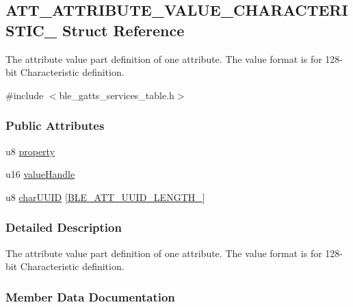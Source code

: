 \hypertarget{struct_a_t_t___a_t_t_r_i_b_u_t_e___v_a_l_u_e___c_h_a_r_a_c_t_e_r_i_s_t_i_c__16}{}\subsection{A\+T\+T\+\_\+\+A\+T\+T\+R\+I\+B\+U\+T\+E\+\_\+\+V\+A\+L\+U\+E\+\_\+\+C\+H\+A\+R\+A\+C\+T\+E\+R\+I\+S\+T\+I\+C\+\_ Struct Reference}
\label{struct_a_t_t___a_t_t_r_i_b_u_t_e___v_a_l_u_e___c_h_a_r_a_c_t_e_r_i_s_t_i_c__16}


The attribute value part definition of one attribute. The value format is for 128-\/bit Characteristic definition.  




{\ttfamily \#include $<$ble\+\_\+gatts\+\_\+services\+\_\+table.\+h$>$}

\subsubsection*{Public Attributes}
\begin{DoxyCompactItemize}
\item 
u8 \hyperlink{struct_a_t_t___a_t_t_r_i_b_u_t_e___v_a_l_u_e___c_h_a_r_a_c_t_e_r_i_s_t_i_c__16_aeb257f71738591eb1cc93084e83e242b}{property}
\item 
u16 \hyperlink{struct_a_t_t___a_t_t_r_i_b_u_t_e___v_a_l_u_e___c_h_a_r_a_c_t_e_r_i_s_t_i_c__16_a03bef1d19b63864b997e6bb8ebf02971}{value\+Handle}
\item 
u8 \hyperlink{struct_a_t_t___a_t_t_r_i_b_u_t_e___v_a_l_u_e___c_h_a_r_a_c_t_e_r_i_s_t_i_c__16_ad44745bf0e2c53f54b9c7886bc03763a}{char\+U\+U\+ID} \mbox{[}\hyperlink{group___b_l_e___a_t_t___u_u_i_d___l_e_n_g_t_h___t_y_p_e_s_ga5a9cf4995e35a99b93e317eb81288e72}{B\+L\+E\+\_\+\+A\+T\+T\+\_\+\+U\+U\+I\+D\+\_\+\+L\+E\+N\+G\+T\+H\+\_}\mbox{]}
\end{DoxyCompactItemize}


\subsubsection{Detailed Description}
The attribute value part definition of one attribute. The value format is for 128-\/bit Characteristic definition. 

\subsubsection{Member Data Documentation}
